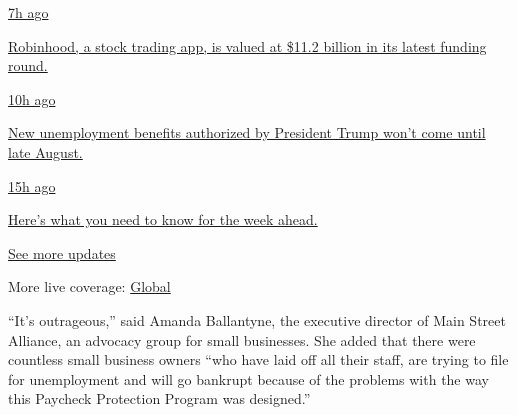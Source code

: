 \href{https://www.nytimes.com/live/2020/08/17/business/stock-market-today-coronavirus?action=click\&pgtype=Article\&state=default\&region=MAIN_CONTENT_1\&context=storylines_live_updates\#robinhood-a-stock-trading-app-is-valued-at-11-2-billion-in-its-latest-funding-round}{7h
ago}

\href{https://www.nytimes.com/live/2020/08/17/business/stock-market-today-coronavirus?action=click\&pgtype=Article\&state=default\&region=MAIN_CONTENT_1\&context=storylines_live_updates\#robinhood-a-stock-trading-app-is-valued-at-11-2-billion-in-its-latest-funding-round}{Robinhood,
a stock trading app, is valued at \$11.2 billion in its latest funding
round.}

\href{https://www.nytimes.com/live/2020/08/17/business/stock-market-today-coronavirus?action=click\&pgtype=Article\&state=default\&region=MAIN_CONTENT_1\&context=storylines_live_updates\#new-unemployment-benefits-authorized-by-president-trump-wont-come-until-late-august}{10h
ago}

\href{https://www.nytimes.com/live/2020/08/17/business/stock-market-today-coronavirus?action=click\&pgtype=Article\&state=default\&region=MAIN_CONTENT_1\&context=storylines_live_updates\#new-unemployment-benefits-authorized-by-president-trump-wont-come-until-late-august}{New
unemployment benefits authorized by President Trump won't come until
late August.}

\href{https://www.nytimes.com/live/2020/08/17/business/stock-market-today-coronavirus?action=click\&pgtype=Article\&state=default\&region=MAIN_CONTENT_1\&context=storylines_live_updates\#heres-what-you-need-to-know-for-the-week-ahead}{15h
ago}

\href{https://www.nytimes.com/live/2020/08/17/business/stock-market-today-coronavirus?action=click\&pgtype=Article\&state=default\&region=MAIN_CONTENT_1\&context=storylines_live_updates\#heres-what-you-need-to-know-for-the-week-ahead}{Here's
what you need to know for the week ahead.}

\href{https://www.nytimes.com/live/2020/08/17/business/stock-market-today-coronavirus?action=click\&pgtype=Article\&state=default\&region=MAIN_CONTENT_1\&context=storylines_live_updates}{See
more updates}

More live coverage:
\href{https://www.nytimes.com/2020/08/17/world/coronavirus-covid.html?action=click\&pgtype=Article\&state=default\&region=MAIN_CONTENT_1\&context=storylines_live_updates}{Global}

``It's outrageous,'' said Amanda Ballantyne, the executive director of
Main Street Alliance, an advocacy group for small businesses. She added
that there were countless small business owners ``who have laid off all
their staff, are trying to file for unemployment and will go bankrupt
because of the problems with the way this Paycheck Protection Program
was designed.''

